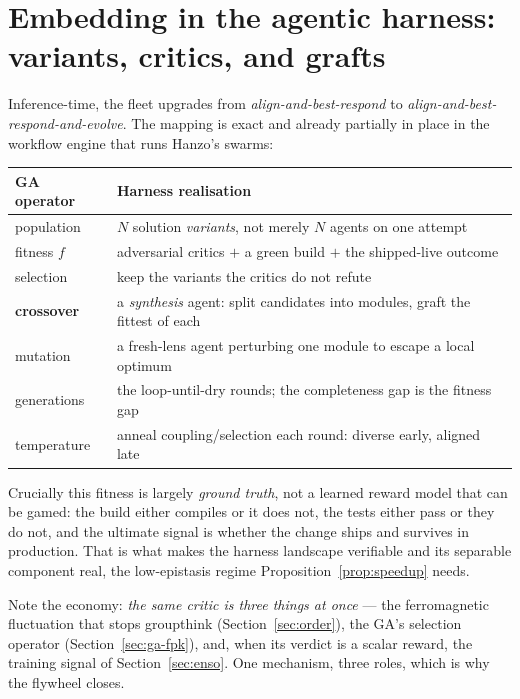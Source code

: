 \documentclass[11pt]{article}
\begin{document}
\section{Embedding in the agentic harness: variants, critics, and grafts}
\label{sec:harness}

Inference-time, the fleet upgrades from \emph{align-and-best-respond} to
\emph{align-and-best-respond-and-evolve}. The mapping is exact and already partially in place in the workflow
engine that runs Hanzo's swarms:

\begin{center}
\begin{tabular}{@{}ll@{}}
\toprule
\textbf{GA operator} & \textbf{Harness realisation} \\
\midrule
population & $N$ solution \emph{variants}, not merely $N$ agents on one attempt \\
fitness $f$ & adversarial critics $+$ a green build $+$ the shipped-live outcome \\
selection & keep the variants the critics do not refute \\
\textbf{crossover} & a \emph{synthesis} agent: split candidates into modules, graft the fittest of each \\
mutation & a fresh-lens agent perturbing one module to escape a local optimum \\
generations & the loop-until-dry rounds; the completeness gap is the fitness gap \\
temperature & anneal coupling/selection each round: diverse early, aligned late \\
\bottomrule
\end{tabular}
\end{center}

Crucially this fitness is largely \emph{ground truth}, not a learned reward model that can be gamed: the
build either compiles or it does not, the tests either pass or they do not, and the ultimate signal is
whether the change ships and survives in production. That is what makes the harness landscape verifiable and
its separable component real, the low-epistasis regime Proposition~\ref{prop:speedup} needs.

Note the economy: \emph{the same critic is three things at once} --- the ferromagnetic fluctuation that stops
groupthink (Section~\ref{sec:order}), the GA's selection operator (Section~\ref{sec:ga-fpk}), and, when its
verdict is a scalar reward, the training signal of Section~\ref{sec:enso}. One mechanism, three roles, which
is why the flywheel closes.
\end{document}
